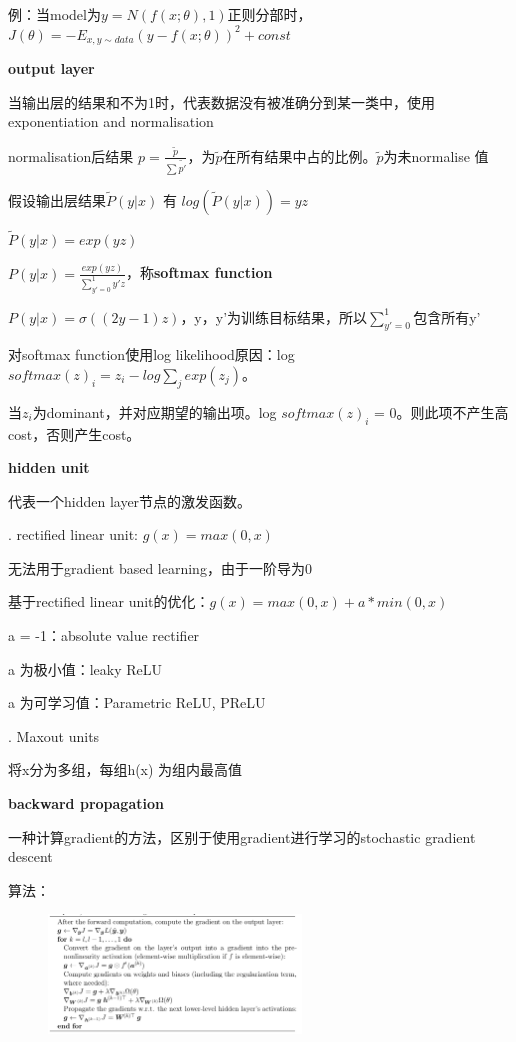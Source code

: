\documentclass[UTF8]{ctexart}
\begin{document}
  \quad \quad 例：当model为$y = N(f(x; \theta), 1)$正则分部时，$J(\theta) = -E_{x, y\sim data}(y - f(x;\theta))^2 + const$

  \textbf{output layer}

  \quad 当输出层的结果和不为1时，代表数据没有被准确分到某一类中，使用exponentiation and normalisation

  \quad \quad normalisation后结果 $p = \frac{\tilde{p} }{\sum \tilde{p'} } $，为$\tilde{p} $在所有结果中占的比例。$\tilde{p} $为未normalise 值

  \quad 假设输出层结果$\tilde{P} (y | x)$ 有 $log(\tilde{P} (y | x)) = yz$

  \quad \quad $\tilde{P} (y | x) = exp(yz)$

  \quad \quad $P (y | x) = \frac{exp(yz)}{\sum_{y' = 0}^{1} y'z } $，称\textbf{softmax function}

  \quad \quad $P (y | x) = \sigma ((2y - 1)z)$，y，y'为训练目标结果，所以$\sum_{y' = 0}^{1} $包含所有y'

  \quad 对softmax function使用log likelihood原因：log $softmax(z)_i = z_i - log\sum_j exp(z_j)$。

  \quad \quad 当$z_i$为dominant，并对应期望的输出项。log $softmax(z)_i$ = 0。则此项不产生高cost，否则产生cost。

  \textbf{hidden unit}

  \quad \quad 代表一个hidden layer节点的激发函数。

  \quad {}. rectified linear unit: $g(x) = max(0, x)$

  \quad \quad \quad 无法用于gradient based learning，由于一阶导为0

  \quad \quad \quad 基于rectified linear unit的优化：$g(x) = max(0, x) + a*min(0, x)$

  \quad \quad \quad \quad a = -1：absolute value rectifier

  \quad \quad \quad \quad a 为极小值：leaky ReLU

  \quad \quad \quad \quad a 为可学习值：Parametric ReLU, PReLU

  \quad {}. Maxout units

  \quad \quad \quad 将x分为多组，每组h(x) 为组内最高值

  \textbf{backward propagation}

  \quad 一种计算gradient的方法，区别于使用gradient进行学习的stochastic gradient descent

  \quad 算法：
  \begin{figure}[H] %
    \centering %
    \includegraphics[width=0.6\textwidth]{note_images/backprop_algo.png} %
  \end{figure}

  
\end{document}
